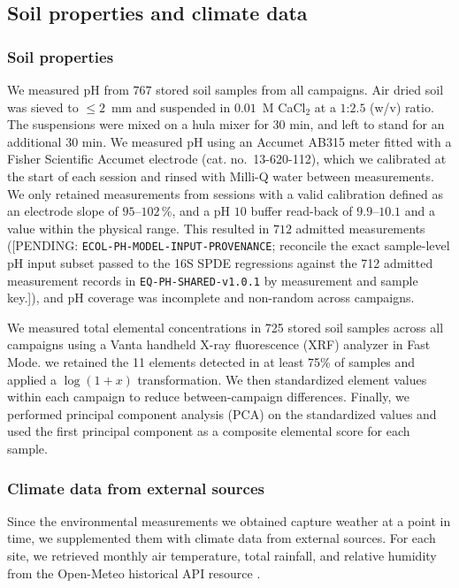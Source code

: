\documentclass[fleqn,10pt,numbers]{olplainarticle}
\begin{document}
\subsection*{Soil properties and climate data}
\subsubsection*{Soil properties}
We measured pH from $767$ stored soil samples from all campaigns. Air dried soil was sieved to $\le 2$~mm and suspended in $0.01$~M CaCl$_2$ at a $1$:$2.5$ (w/v) ratio. The suspensions were mixed on a hula mixer for 30 min, and left to stand for an additional 30 min. We measured pH using an Accumet AB315 meter fitted with a Fisher Scientific Accumet electrode (cat. no.\ 13-620-112), which we calibrated at the start of each session and rinsed with Milli-Q water between measurements. We only retained measurements from sessions with a valid calibration defined as an electrode slope of $95$--$102\,\%$, and a pH $10$ buffer read-back of $9.9$--$10.1$ and a value within the physical range. This resulted in $712$ admitted measurements ([PENDING: \texttt{ECOL-PH-MODEL-\allowbreak INPUT-\allowbreak PROVENANCE}; reconcile the exact sample-level pH input subset passed to the 16S SPDE regressions against the 712 admitted measurement records in \texttt{EQ-PH-\allowbreak SHARED-\allowbreak v1.0.1} by measurement and sample key.]), and pH coverage was incomplete and non-random across campaigns.

We measured total elemental concentrations in 725 stored soil samples across all campaigns using a Vanta handheld X-ray fluorescence (XRF) analyzer in Fast Mode. we retained the 11 elements detected in at least 75\% of samples and applied a $\log(1+x)$ transformation. We then standardized element values within each campaign to reduce between-campaign differences. Finally, we performed principal component analysis (PCA) on the standardized values and used the first principal component as a composite elemental score for each sample.

\subsubsection*{Climate data from external sources}
Since the environmental measurements we obtained capture weather at a point in time, we supplemented them with climate data from external sources. For each site, we retrieved monthly air temperature, total rainfall, and relative humidity from the Open-Meteo historical API resource \cite{openmeteo}.
\end{document}
